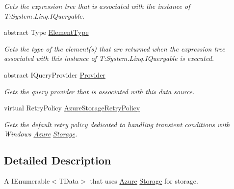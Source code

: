 \begin{DoxyCompactItemize}
\begin{DoxyCompactList}\small\item\em Gets the expression tree that is associated with the instance of T\+:\+System.\+Linq.\+I\+Queryable. \end{DoxyCompactList}\item 
abstract Type \hyperlink{classCqrs_1_1Azure_1_1BlobStorage_1_1StorageStore_af298920154f31a7d0117facbb2f7cd54_af298920154f31a7d0117facbb2f7cd54}{Element\+Type}
\begin{DoxyCompactList}\small\item\em Gets the type of the element(s) that are returned when the expression tree associated with this instance of T\+:\+System.\+Linq.\+I\+Queryable is executed. \end{DoxyCompactList}\item 
abstract I\+Query\+Provider \hyperlink{classCqrs_1_1Azure_1_1BlobStorage_1_1StorageStore_a3cc5fd841fb449ca365d05a52e8e8438_a3cc5fd841fb449ca365d05a52e8e8438}{Provider}
\begin{DoxyCompactList}\small\item\em Gets the query provider that is associated with this data source. \end{DoxyCompactList}\item 
virtual Retry\+Policy \hyperlink{classCqrs_1_1Azure_1_1BlobStorage_1_1StorageStore_ad16f8d276c7570c95979b39098d1216b_ad16f8d276c7570c95979b39098d1216b}{Azure\+Storage\+Retry\+Policy}
\begin{DoxyCompactList}\small\item\em Gets the default retry policy dedicated to handling transient conditions with Windows \hyperlink{namespaceCqrs_1_1Azure}{Azure} \hyperlink{namespaceCqrs_1_1Azure_1_1Storage}{Storage}. \end{DoxyCompactList}\end{DoxyCompactItemize}


\subsection{Detailed Description}
A I\+Enumerable$<$\+T\+Data$>$ that uses \hyperlink{namespaceCqrs_1_1Azure}{Azure} \hyperlink{namespaceCqrs_1_1Azure_1_1Storage}{Storage} for storage. 



